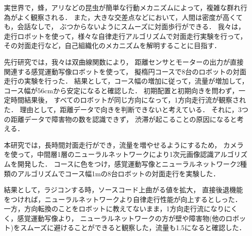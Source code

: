 実世界で，蜂，アリなどの昆虫が簡単な行動メカニズムによって，複雑な群れ行為がよく観察される．
また，大きな交差点などにおいて，人間は密度が高くても，会話なしで，
ぶつからないようにスムーズに対面歩行ができる．
我々は，走行ロボットを使って，様々な自律走行アルゴリズムで対面走行実験を行って，
その対面走行など，自己組織化のメカニズムを解明することに目指す．

先行研究\cite{li}では，我々は双曲線関数により，
距離センサとモーターの出力が直接関連する感覚運動写像ロボットを使って，
擬楕円コースで8台のロボットの対面走行の実験を行った．
結果として，コース幅の増加に従って，流量が増加して，
コース幅が56cmから安定になると確認した．
初期配置と初期向きを問わず，一定時間結果後，
すべてのロボットが同じ方向になって，1方向走行流が観察された．
理由として，距離データで向きを判断できないと考えている．
それに，3つの距離データで障害物の数を認識できず，
渋滞が起こることの原因になると考える．

本研究では，長時間対面走行ができ，流量を増やせるようにするため，
カメラを使って，中間層1層のニューラルネットワークにより1次元画像認識アルゴリズムを開発した．
コースに色をつけ，感覚運動写像とニューラルネットワーク2種類のアルゴリズムでコース幅1mの8台ロボットの対面走行を実験した．

結果として，ラジコンする時，ソースコード上曲がる値を拡大，
直接後退機能をつければ，ニューラルネットワークより自律走行性能が向上するとしった．
一方，方向転換のことをロボットに教えてないまま，1方向走行流になりにくく，感覚運動写像より，
ニューラルネットワークの方が壁や障害物(他のロボット)をスムーズに避けることができると観察した，流量も1.5になると確認した．


